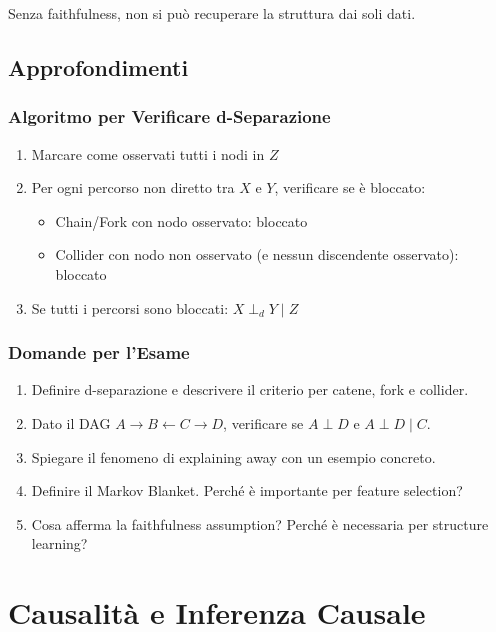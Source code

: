 Senza faithfulness, non si può recuperare la struttura dai soli dati.

\section{Approfondimenti}

\subsection{Algoritmo per Verificare d-Separazione}
\begin{enumerate}
    \item Marcare come osservati tutti i nodi in $Z$
    \item Per ogni percorso non diretto tra $X$ e $Y$, verificare se è bloccato:
    \begin{itemize}
        \item Chain/Fork con nodo osservato: bloccato
        \item Collider con nodo non osservato (e nessun discendente osservato): bloccato
    \end{itemize}
    \item Se tutti i percorsi sono bloccati: $X \perp_d Y \mid Z$
\end{enumerate}

\subsection{Domande per l'Esame}
\begin{enumerate}
    \item Definire d-separazione e descrivere il criterio per catene, fork e collider.
    \item Dato il DAG $A \to B \leftarrow C \to D$, verificare se $A \perp D$ e $A \perp D \mid C$.
    \item Spiegare il fenomeno di explaining away con un esempio concreto.
    \item Definire il Markov Blanket. Perché è importante per feature selection?
    \item Cosa afferma la faithfulness assumption? Perché è necessaria per structure learning?
\end{enumerate}

\chapter{Causalità e Inferenza Causale}\label{ch:causality}

